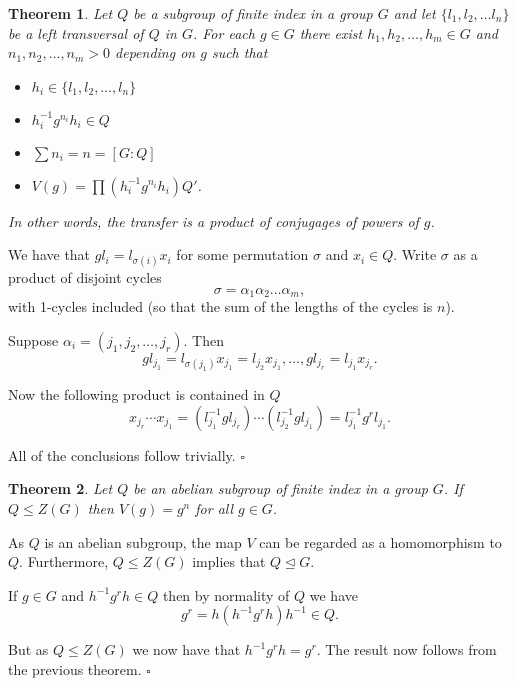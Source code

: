 \documentclass[10pt]{article}
\newtheorem{theorem}{Theorem}[section]
\newenvironment{proof}[1][Proof]{\begin{trivlist}
\item[\hskip \labelsep {\itshape #1}]}{\end{trivlist}}
\begin{document}
\begin{theorem}
Let $Q$ be a subgroup of finite index in a group $G$ and let $\{l_1, l_2, \ldots l_n\}$ be a left transversal of $Q$ in $G$. For each $g \in G$ there exist $h_1, h_2, \ldots, h_m \in G$ and $n_1, n_2, \ldots, n_m > 0$ depending on $g$ such that 
\begin{itemize}
\item $h_i \in \{l_1, l_2, \ldots, l_n\}$
\item $h_i^{-1}g^{n_i}h_i \in Q$
\item $\sum n_i = n = [G:Q]$
\item $V(g) = \prod (h_i^{-1}g^{n_i}h_i)Q'$.
\end{itemize}
In other words, the transfer is a product of conjugages of powers of $g$.
\end{theorem}

\begin{proof}
We have that $gl_i = l_{\sigma(i)}x_i$ for some permutation $\sigma$ and $x_i \in Q$. Write $\sigma$ as a product of disjoint cycles
$$\sigma = \alpha_1\alpha_2\ldots \alpha_m,$$
with 1-cycles included (so that the sum of the lengths of the cycles is $n$).

Suppose $\alpha_i = (j_1, j_2, \ldots, j_r)$. Then
$$gl_{j_1} = l_{\sigma(j_1)}x_{j_1} = l_{j_2}x_{j_1}, \ldots, gl_{j_r} = l_{j_1}x_{j_r}.$$

Now the following product is contained in $Q$
$$x_{j_r}\cdots x_{j_1} = (l_{j_1}^{-1}gl_{j_r})\cdots (l_{j_2}^{-1}gl_{j_1}) = l_{j_1}^{-1}g^rl_{j_1}.$$

All of the conclusions follow trivially. $\square$
\end{proof}

\begin{theorem}
Let $Q$ be an abelian subgroup of finite index in a group $G$. If $Q \leq Z(G)$ then $V(g) = g^n$ for all $g\in G$.
\end{theorem}

\begin{proof}
As $Q$ is an abelian subgroup, the map $V$ can be regarded as a homomorphism to $Q$. Furthermore, $Q \leq Z(G)$ implies that $Q \mathrel{\unlhd} G$.

If $g \in G$ and $h^{-1}g^rh \in Q$ then by normality of $Q$ we have
$$g^r = h(h^{-1}g^rh)h^{-1} \in Q.$$

But as $Q \leq Z(G)$ we now have that $h^{-1}g^rh = g^r$. The result now follows from the previous theorem. $\square$
\end{proof}
\end{document}
